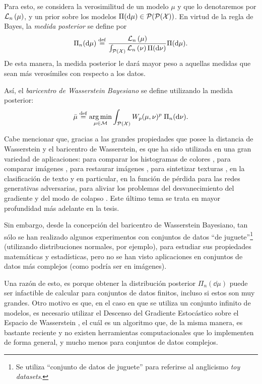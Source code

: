 Para esto, se considera la verosimilitud de un modelo $\mu$ y que lo denotaremos por $\LikelihoodN[\mu]$, y un prior sobre los modelos $\Pi(\dd \mu) \in \ProbSpace[\ProbSpace[\cX]]$. En virtud de la regla de Bayes, la \emph{medida posterior} se define por
\begin{equation}
    \Pi_n(\dd \mu) \eqdef \frac{\LikelihoodN[\mu]}{\int_{\ProbSpace[\cX]} \LikelihoodN[\nu] \Pi(\dd \nu)} \Pi(\dd \mu).
\end{equation}
De esta manera, la medida posterior le dará mayor peso a aquellas medidas que sean más verosímiles con respecto a los datos.

Así, el \emph{baricentro de Wasserstein Bayesiano} se define utilizando la medida posterior:
\begin{equation}
    \bar\mu \eqdef \argmin_{\mu \in \Models} \int_{\ProbSpace[\cX]} \Wasserstein[p]{\mu}{\nu}^p \; {\Pi_n(\dd \nu)}.
\end{equation}


Cabe mencionar que, gracias a las grandes propiedades que posee la distancia de Wasserstein y el baricentro de Wasserstein, es que ha sido utilizada en una gran variedad de aplicaciones:
para comparar los histogramas de colores \cite{rubner1998metric}, para comparar imágenes \cite{peleg1989unified}, para restaurar imágenes \cite{lellmann2014imaging}, para sintetizar texturas \cite{tartavel2016wasserstein}, en la clasificación de texto \cite{kusner2015word} y en particular,
en la función de pérdida para las redes generativas adversarias, para aliviar los problemas del desvanecimiento del gradiente y del modo de colapso \cite{arjovsky2017wasserstein}. Este último tema se trata en mayor profundidad más adelante en la tesis.

Sin embargo, desde la concepción del baricentro de Wasserstein Bayesiano, tan sólo se han realizado algunos experimentos con conjuntos de datos ``de juguete''\footnote{Se utiliza ``conjunto de datos de juguete'' para referirse al anglicismo \textit{toy datasets}.} (utilizando distribuciones normales, por ejemplo), para estudiar sus propiedades matemáticas y estadísticas, pero no se han visto aplicaciones en conjuntos de datos más complejos (como podría ser en imágenes).


Una razón de esto, es porque obtener la distribución posterior $\Pi_n(\dd \mu)$ puede ser infactible de calcular para conjuntos de datos finitos, incluso si estos son muy grandes. Otro motivo es que, en el caso en que se utiliza un conjunto infinito de modelos, es necesario utilizar el Descenso del Gradiente Estocástico sobre el Espacio de Wasserstein \cite{backhoff2022stochastic}, el cuál es un algoritmo que, de la misma manera, es bastante reciente y no existen herramientas computacionales que lo implementen de forma general, y mucho menos para conjuntos de datos complejos.

